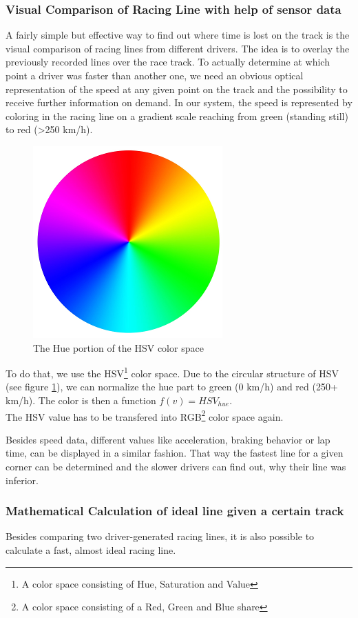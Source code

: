 \subsubsection{Visual Comparison of Racing Line with help of sensor data}
A fairly simple but effective way to find out where time is lost on the track is the visual comparison of racing lines from different drivers. The idea is to overlay the previously recorded lines over the race track. To actually determine at which point a driver was faster than another one, we need an obvious optical representation of the speed at any given point on the track and the possibility to receive further information on demand.
In our system, the speed is represented by coloring in the racing line on a gradient scale reaching from green (standing still) to red (>250 km/h).

\begin{figure}[!ht]
\centering
\includegraphics[width=.3\textwidth]{gradient_hsv}
\caption{The Hue portion of the HSV color space}
\label{fig:hsv_gradient}
\end{figure}

To do that, we use the HSV\footnote{A color space consisting of Hue, Saturation and Value} color space. Due to the circular structure of HSV (see figure \ref{fig:hsv_gradient}), we can normalize the hue part to green (0 km/h) and red (250+ km/h). The color is then a function $f(v) = HSV_{hue}$.\\
The HSV value has to be transfered into RGB\footnote{A color space consisting of a Red, Green and Blue share} color space again.

Besides speed data, different values like acceleration, braking behavior or lap time, can be displayed in a similar fashion. That way the fastest line for a given corner can be determined and the slower drivers can find out, why their line was inferior.

\subsubsection{Mathematical Calculation of ideal line given a certain track}
Besides comparing two driver-generated racing lines, it is also possible to calculate a fast, almost ideal racing line.

